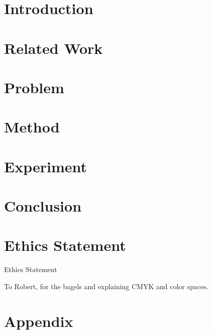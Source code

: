 \documentclass[sigconf, anonymous, review]{acmart}
\begin{document}
\section{Introduction}
\label{sec:intro}


\section{Related Work}
\label{sec:related}


\section{Problem}
\label{sec:attack}


\section{Method}
\label{sec:method}


\section{Experiment}
\label{sec:experiment}


\section{Conclusion}
\label{sec:conclusion}


\section{Ethics Statement}
\label{sec:ethics}
Ethics Statement

\begin{acks}
To Robert, for the bagels and explaining CMYK and color spaces.
\end{acks}





\clearpage
\appendix
\section{Appendix}

\label{sec:appendix}
\end{document}
